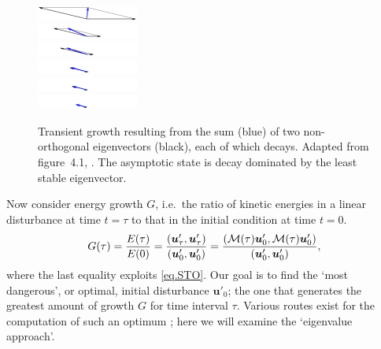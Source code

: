 \documentclass[11pt,a4paper]{report}
\newcommand{\ie}{i.e.\ }
\newcommand\uvec{\bm{u}}
\newcommand\Mop{{\cal M}}
\begin{document}
\begin{figure}
\begin{center}
\includegraphics[width=0.3\textwidth]{nn0000.png}\\
\includegraphics[width=0.3\textwidth]{nn0025.png}\\
\includegraphics[width=0.3\textwidth]{nn0040.png}\\
\includegraphics[width=0.3\textwidth]{nn0070.png}\\
\includegraphics[width=0.3\textwidth]{nn0080.png}\\
\includegraphics[width=0.3\textwidth]{nn0100.png}
\end{center}
\caption{Transient growth resulting from the sum (blue) of two
  non-orthogonal eigenvectors (black), each of which decays.  Adapted
  from figure~4.1, \cite{schmid01}. The asymptotic state is decay
  dominated by the least stable eigenvector. }
\label{fig.tg}
\end{figure}

Now consider energy growth $G$, \ie the ratio of kinetic energies in a
linear disturbance at time $t=\tau$ to that in the initial condition
at time $t=0$.
\begin{equation}
G(\tau)=\frac{E(\tau)}{E(0)}=
\frac{(\bm{u}'_\tau,\bm{u}'_\tau)}{(\bm{u}'_0,\bm{u}'_0)}=
\frac{(\Mop(\tau)\bm{u}'_0,\Mop(\tau)\bm{u}'_0)}{(\bm{u}'_0,\bm{u}'_0)},
\end{equation}
where the last equality exploits \eqref{eq.STO}.  Our goal is to find
the `most dangerous', or optimal, initial disturbance $\uvec'_0$; the
one that generates the greatest amount of growth $G$ for time interval
$\tau$.  Various routes exist for the computation of such an optimum
\citep{mbs13}; here we will examine the `eigenvalue approach'.
\end{document}
